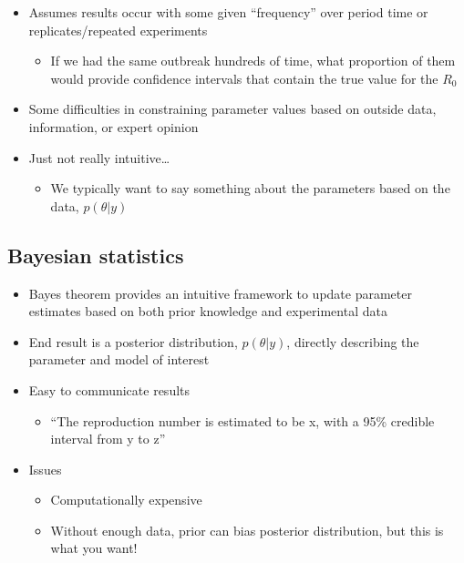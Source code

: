 \documentclass[
  letterpaper,
  DIV=11,
  numbers=noendperiod]{scrartcl}
\providecommand{\tightlist}{%
  \setlength{\itemsep}{0pt}\setlength{\parskip}{0pt}}\usepackage{longtable,booktabs,array}
\begin{document}
\begin{itemize}
\tightlist
\item
  Assumes results occur with some given ``frequency'' over period time
  or replicates/repeated experiments

  \begin{itemize}
  \tightlist
  \item
    If we had the same outbreak hundreds of time, what proportion of
    them would provide confidence intervals that contain the true value
    for the \(R_0\)
  \end{itemize}
\item
  Some difficulties in constraining parameter values based on outside
  data, information, or expert opinion
\item
  Just not really intuitive\ldots{}

  \begin{itemize}
  \tightlist
  \item
    We typically want to say something about the parameters based on the
    data, \(p(\theta|y)\)
  \end{itemize}
\end{itemize}

\hypertarget{bayesian-statistics}{%
\subsection{Bayesian statistics}\label{bayesian-statistics}}

\begin{itemize}
\tightlist
\item
  Bayes theorem provides an intuitive framework to update parameter
  estimates based on both prior knowledge and experimental data
\item
  End result is a posterior distribution, \(p(\theta|y)\), directly
  describing the parameter and model of interest
\item
  Easy to communicate results

  \begin{itemize}
  \tightlist
  \item
    ``The reproduction number is estimated to be x, with a 95\% credible
    interval from y to z''
  \end{itemize}
\item
  Issues

  \begin{itemize}
  \tightlist
  \item
    Computationally expensive
  \item
    Without enough data, prior can bias posterior distribution, but this
    is what you want!
  \end{itemize}
\end{itemize}
\end{document}
